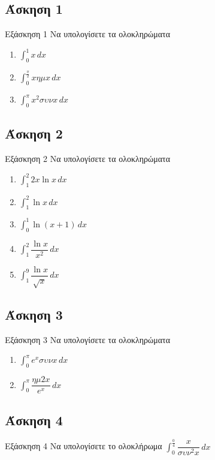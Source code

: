 \documentclass[greek]{beamer}
\begin{document}
\subsection{Άσκηση 1}
\begin{frame}[label=Άσκηση1,t]{Εξάσκηση 1}
 Να υπολογίσετε τα ολοκληρώματα
 \begin{enumerate}
  \item<1-> $\int_{0}^{1}x\,dx$
  \item<2-> $\int_{0}^{\frac{π}{2}}xημx\,dx$
  \item<3-> $\int_{0}^{π}x^2συνx\,dx$
 \end{enumerate}

\end{frame}

\subsection{Άσκηση 2}
\begin{frame}[label=Άσκηση2,t]{Εξάσκηση 2}
 Να υπολογίσετε τα ολοκληρώματα
 \begin{enumerate}
  \item<1-> $\int_{1}^{2} 2x\ln x \,dx$
  \item<2-> $\int_{1}^{2} \ln x \,dx$
  \item<3-> $\int_{0}^{1} \ln (x+1) \,dx$
  \item<4-> $\int_{1}^{2} \dfrac{\ln x}{x^2} \,dx$
  \item<5-> $\int_{1}^{9} \dfrac{\ln x}{\sqrt{x}} \,dx$
 \end{enumerate}

\end{frame}

\subsection{Άσκηση 3}
\begin{frame}[label=Άσκηση3,t]{Εξάσκηση 3}
 Να υπολογίσετε τα ολοκληρώματα
 \begin{enumerate}
  \item<1-> $\int_{0}^{π} e^xσυνx \,dx$
  \item<2-> $\int_{0}^{π} \dfrac{ημ2x}{e^x} \,dx$
 \end{enumerate}

\end{frame}

\subsection{Άσκηση 4}
\begin{frame}[label=Άσκηση4,t]{Εξάσκηση 4}
 Να υπολογίσετε το ολοκλήρωμα $\int_{0}^{\frac{0}{4}} \dfrac{x}{συν^2x} \,dx$

\end{frame}
\end{document}
